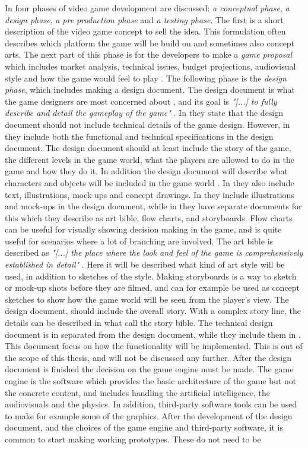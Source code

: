 In \cite{understandingvg} four phases of video game development are discussed: \emph{a conceptual phase}, \emph{a design phase}, \emph{a pre production phase} and \emph{a testing phase}. The first is a short description of the video game concept to sell the idea. This formulation often describes which platform the game will be build on and sometimes also concept arts. The next part of this phase is for the developers to make a \emph{game proposal} which includes market analysis, technical issues, budget projections, audiovisual style and how the game would feel to play \cite{understandingvg}. The following phase is the \emph{design phase}, which includes making a design document. The design document is what the game designers are most concerned about \cite{gamedesign}, and its goal is \emph{"[...] to fully describe and detail the gameplay of the game"} \cite{gamedesign}.  In \cite{gamedesign} they state that the design document should not include  technical details of the game design. However, in \cite{understandingvg} they include both the functional and technical specifications in the design document. The design document should at least include the story of the game, the different levels in the game world, what the players are allowed to do in the game and how they do it. In addition the design document will describe what characters and objects will be included in the game world \cite{gamedesign}. In \cite{understandingvg} they also include text, illustrations, mock-ups and concept drawings. In \cite{understandingvg} they include illustrations and mock-ups in the design document, while in \cite{gamedesign} they have separate documents for this which they describe as art bible, flow charts, and storyboards. Flow charts can be useful for visually showing decision making in the game, and is quite useful for scenarios where a lot of branching are involved. The art bible is described as \emph{"[...] the place where the look and feel of the game is comprehensively established in detail"} \cite{gamedesign}. Here it will be described what kind of art style will be used, in addition to sketches of the style. Making storyboards is a way to sketch or mock-up shots before they are filmed, and can for example be used as concept sketches to show how the game world will be seen from the player's view. The design document, should include the overall story. With a complex story line, the details can be described in what \cite{gamedesign} call the story bible.  The technical design document is in \cite{gamedesign} separated from the design document, while they include them in \cite{understandingvg}. This document focus on how the functionality will be implemented. This is out of the scope of this thesis, and will not be discussed any further. After the design document is finished the decision on the game engine must be made. The game engine is the software which provides the basic architecture of the game but not the concrete content, and includes handling the artificial intelligence, the audiovisuals and the physics. In addition, third-party software tools can be used to make for example some of the graphics. After the development of the design document, and the choices of the game engine and third-party software, it is common to start making working prototypes. These do not need to be 